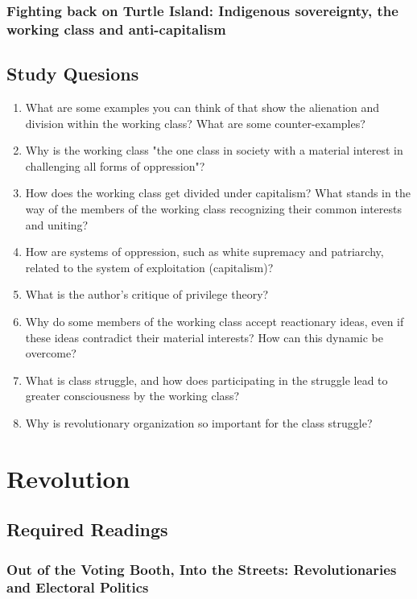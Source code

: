 \documentclass[12pt,a4paper]{report}
\begin{document}
\subsection{Fighting back on Turtle Island: Indigenous sovereignty, the working class and anti-capitalism}

\clearpage

\section{Study Quesions}

\begin{enumerate}
	\item What are some examples you can think of that show the alienation and division within the working class? What are some counter-examples?
	\item Why is the working class "the one class in society with a material interest in challenging all forms of oppression"?
	\item How does the working class get divided under capitalism? What stands in the way of the members of the working class recognizing their common interests and uniting?
	\item How are systems of oppression, such as white supremacy and patriarchy, related to the system of exploitation (capitalism)?
	\item What is the author's critique of privilege theory?
	\item Why do some members of the working class accept reactionary ideas, even if these ideas contradict their material interests? How can this dynamic be overcome?
	\item What is class struggle, and how does participating in the struggle lead to greater consciousness by the working class?
	\item Why is revolutionary organization so important for the class struggle?
\end{enumerate}
\clearpage

\chapter{Revolution}
\section{Required Readings}
\subsection{Out of the Voting Booth, Into the Streets: Revolutionaries and Electoral Politics}

\clearpage
\end{document}

